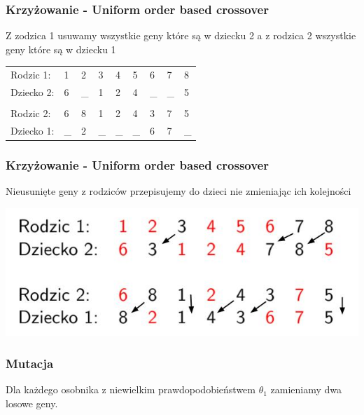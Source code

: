 \documentclass{beamer}
\begin{document}
\begin{frame}
 \frametitle{Krzyżowanie - Uniform order based crossover}
 Z zodzica 1  usuwamy wszystkie geny które są w dziecku 2 a z rodzica 2 wszystkie geny które są w dziecku 1
\begin{center}
\begin{tabular}{lllllllll}
Rodzic 1: & {\color{red}1} & {\color{red}2}& 3 & {\color{red}4} & {\color{red}5} & {\color{red}6} & 7 & 8\\
Dziecko 2: & {\color{red}6} & \_ & {\color{red}1} & {\color{red}2} & {\color{red}4} & \_ & \_ & {\color{red}5}\\ \\

Rodzic 2: & {\color{red}6} & 8 & 1 & {\color{red}2} & 4 & 3 & {\color{red}7} & 5\\
Dziecko 1: & \_ & {\color{red}2} & \_ & \_ & \_ & {\color{red}6} & {\color{red}7} & \_\\


\end{tabular}
\end{center}

 

\end{frame}


\begin{frame}
 \frametitle{Krzyżowanie - Uniform order based crossover}
 Nieusunięte geny z rodziców przepisujemy do dzieci nie zmieniając ich kolejności
 
 \begin{center}
 \includegraphics[scale=0.5]{./Grafika/crossover.jpg}
\end{center}

 

\end{frame}


\begin{frame}
 \frametitle{Mutacja}

 Dla każdego osobnika z niewielkim prawdopodobieństwem $ \theta_1 $ zamieniamy dwa losowe geny.

\end{frame}
\end{document}
